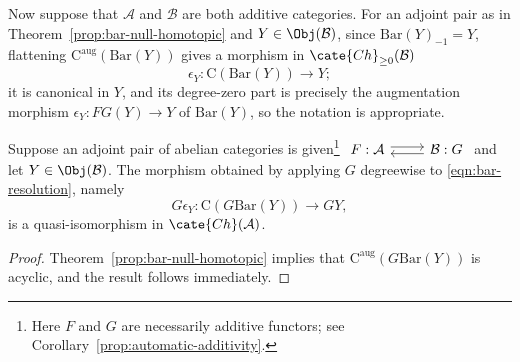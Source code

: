 Now suppose that $\mathcal{A}$ and $\mathcal{B}$ are both additive
categories. For an adjoint pair as in
Theorem~\ref{prop:bar-null-homotopic} and $Y\in\Obj(\mathcal{B})$, since
$\mathrm{Bar}(Y)_{-1}=Y$, flattening
$\mathrm{C}^{\mathrm{aug}}(\mathrm{Bar}(Y))$ gives a morphism in
$\cate{Ch}_{\geq0}(\mathcal{B})$
\begin{equation}\label{eqn:bar-resolution}
	\epsilon_Y: \mathrm{C}(\mathrm{Bar}(Y)) \to Y;
\end{equation}
it is canonical in $Y$, and its degree-zero part is precisely the augmentation
morphism $\epsilon_Y:FG(Y)\to Y$ of $\mathrm{Bar}(Y)$, so the notation is
appropriate.

\begin{corollary}\label{prop:bar-exactness-G}
	Suppose an adjoint pair of abelian categories is given\footnote{Here $F$
	and $G$ are necessarily additive functors; see
	Corollary~\ref{prop:automatic-additivity}.}
	$\begin{tikzcd}
		F : \mathcal{A} \arrow[shift left, r] & \mathcal{B}: G \arrow[shift left, l]
	\end{tikzcd}$
	and let $Y\in\Obj(\mathcal{B})$. The morphism obtained by applying $G$
	degreewise to \eqref{eqn:bar-resolution}, namely
	\[ G\epsilon_Y: \mathrm{C}(G\mathrm{Bar}(Y)) \to GY ,\]
	is a quasi-isomorphism in $\cate{Ch}(\mathcal{A})$.
\end{corollary}
\begin{proof}
	Theorem~\ref{prop:bar-null-homotopic} implies that
	$\mathrm{C}^{\mathrm{aug}}(G\mathrm{Bar}(Y))$ is acyclic, and the result
	follows immediately.
\end{proof}

